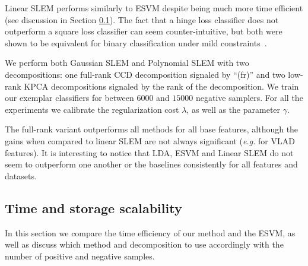 Linear SLEM performs similarly to ESVM despite being much more time efficient (see discussion in Section \ref{time-scale}). 
The fact that a hinge loss classifier does not outperform a square loss classifier can seem counter-intuitive, but both were shown to be equivalent for binary classification under mild constraints~\cite{YeXi07}.

We perform both Gaussian SLEM and Polynomial SLEM with two decompositions: one full-rank CCD decomposition signaled by ``(fr)'' and two low-rank KPCA decompositions signaled by the rank of the decomposition. We train our exemplar classifiers for between $6000$ and $15000$ negative samplers. For all the experiments we calibrate the regularization cost $\lambda$, as well as the parameter $\gamma$. 

The full-rank variant outperforms all methods for all base features, although the gains when compared to linear SLEM are not always significant (\emph{e.g.} for VLAD features). It is interesting to notice that LDA, ESVM and Linear SLEM do not seem to outperform one another or the baselines consistently for all features and datasets.








\subsection{Time and storage scalability} \label{time-scale}
In this section we compare the time efficiency of our method and the ESVM, as well as discuss which method and decomposition to use accordingly with the number of positive and negative samples.

